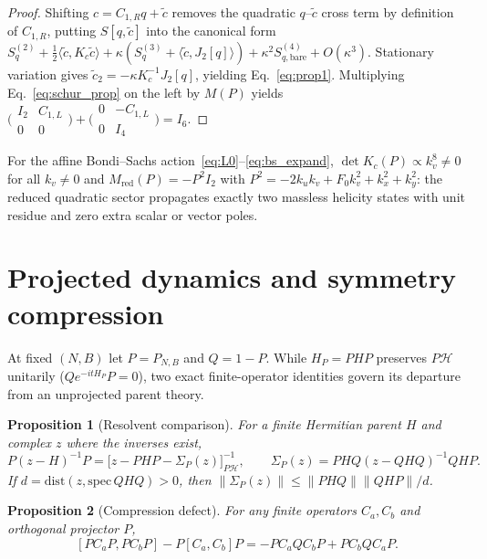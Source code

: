 \documentclass[11pt]{article}
\newtheorem{proposition}{Proposition}
\newcommand{\calH}{\mathcal{H}}
\begin{document}
\begin{proof}
Shifting $c = C_{1,R}q + \tilde c$ removes the quadratic $q$--$\tilde c$ cross term by definition of $C_{1,R}$, putting $S[q,\tilde c]$ into the canonical form $S_q^{(2)} + \frac{1}{2}\langle\tilde c, K_c\tilde c\rangle + \kappa(S_q^{(3)} + \langle\tilde c, J_2[q]\rangle) + \kappa^2 S_{q,\mathrm{bare}}^{(4)} + O(\kappa^3)$. Stationary variation gives $\tilde c_2 = -\kappa K_c^{-1}J_2[q]$, yielding Eq.~\eqref{eq:prop1}. Multiplying Eq.~\eqref{eq:schur_prop} on the left by $M(P)$ yields $\bigl(\begin{smallmatrix}I_2 & C_{1,L}\\ 0 & 0\end{smallmatrix}\bigr) + \bigl(\begin{smallmatrix}0 & -C_{1,L}\\ 0 & I_4\end{smallmatrix}\bigr) = I_6$.
\end{proof}

For the affine Bondi--Sachs action~\eqref{eq:L0}--\eqref{eq:bs_expand}, $\det K_c(P) \propto k_v^8 \neq 0$ for all $k_v \neq 0$ and $M_{\mathrm{red}}(P) = -P^2 I_2$ with $P^2 = -2k_u k_v + F_0 k_v^2 + k_x^2 + k_y^2$: the reduced quadratic sector propagates exactly two massless helicity states with unit residue and zero extra scalar or vector poles.

\section{Projected dynamics and symmetry compression}\label{sec:projection}

At fixed $(N, B)$ let $P = P_{N,B}$ and $Q = 1 - P$. While $H_P = PHP$ preserves $P\calH$ unitarily ($Qe^{-itH_P}P = 0$), two exact finite-operator identities govern its departure from an unprojected parent theory.

\begin{proposition}[Resolvent comparison]\label{prop:resolvent}
For a finite Hermitian parent $H$ and complex $z$ where the inverses exist,
\begin{equation}\label{eq:resolvent}
P(z - H)^{-1}P = \big[z - PHP - \Sigma_P(z)\big]_{P\calH}^{-1}, \qquad
\Sigma_P(z) = PHQ(z - QHQ)^{-1}QHP.
\end{equation}
If $d = \mathrm{dist}(z, \mathrm{spec}\,QHQ) > 0$, then $\|\Sigma_P(z)\| \le \|PHQ\|\|QHP\| / d$.
\end{proposition}

\begin{proposition}[Compression defect]\label{prop:compression}
For any finite operators $C_a, C_b$ and orthogonal projector $P$,
\begin{equation}\label{eq:comp_defect}
[PC_a P, PC_b P] - P[C_a, C_b]P = -P C_a Q C_b P + P C_b Q C_a P.
\end{equation}
\end{proposition}
\end{document}
